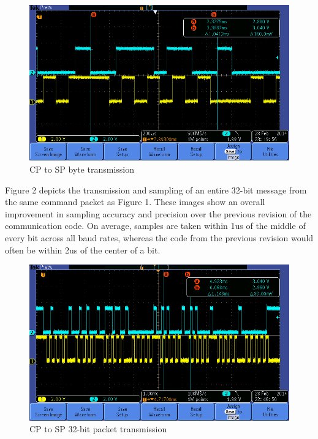 \documentclass{article}
\begin{document}
\begin{figure}[!h]
\centerline{\includegraphics[scale=0.5]{9600_Byte_CPtoSP}}
\caption{CP to SP byte transmission}
\end{figure}

Figure 2 depicts the transmission and sampling of an entire 32-bit message from the same command packet as Figure 1. These images show an overall improvement in sampling accuracy and precision over the previous revision of the communication code. On average, samples are taken within 1us of the middle of every bit across all baud rates, whereas the code from the previous revision would often be within 2us of the center of a bit.

\begin{figure}[!h]
\centerline{\includegraphics[scale=0.5]{9600_PACKET_CPtoSP}}
\caption{CP to SP 32-bit packet transmission}
\end{figure}

\newpage
\end{document}
